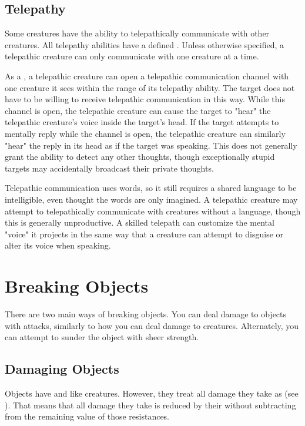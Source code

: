     \subsection{Telepathy}\label{Telepathy}
        Some creatures have the ability to telepathically communicate with other creatures.
        All telepathy abilities have a defined .
        Unless otherwise specified, a telepathic creature can only communicate with one creature at a time.

        As a , a telepathic creature can open a telepathic communication channel with one creature it sees within the range of its telepathy ability.
        The target does not have to be willing to receive telepathic communication in this way.
        While this channel is open, the telepathic creature can cause the target to "hear" the telepathic creature's voice inside the target's head.
        If the target attempts to mentally reply while the channel is open, the telepathic creature can similarly "hear" the reply in its head as if the target was speaking.
        This does not generally grant the ability to detect any other thoughts, though exceptionally stupid targets may accidentally broadcast their private thoughts.

        Telepathic communication uses words, so it still requires a shared language to be intelligible, even thought the words are only imagined.
        A telepathic creature may attempt to telepathically communicate with creatures without a language, though this is generally unproductive.
        A skilled telepath can customize the mental "voice" it projects in the same way that a creature can attempt to disguise or alter its voice when speaking.

\section{Breaking Objects}
    There are two main ways of breaking objects.
    You can deal damage to objects with attacks, similarly to how you can deal damage to creatures.
    Alternately, you can attempt to sunder the object with sheer strength.

    \subsection{Damaging Objects}
        Objects have  and  like creatures.
        However, they treat all damage they take as  (see ).
        That means that all damage they take is reduced by their  without subtracting from the remaining value of those resistances.

